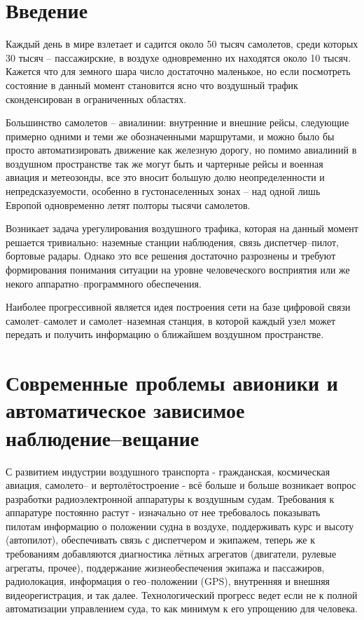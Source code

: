 \documentclass[a4paper,12pt]{report} %
\begin{document}
\tableofcontents

\setlength{\parskip}{1em}
\chapter*{Введение} %

Каждый день в мире взлетает и садится около 50 тысяч самолетов, среди
которых 30 тысяч -- пассажирские, в воздухе одновременно их находятся около 10
тысяч. Кажется что для земного шара число достаточно маленькое, но если
посмотреть состояние в данный момент становится ясно что воздушный трафик
сконденсирован в ограниченных областях.

Большинство самолетов -- авиалинии: внутренние и внешние рейсы, следующие
примерно одними и теми же обозначенными маршрутами, и можно было бы просто
автоматизировать движение как железную дорогу, но помимо авиалиний в воздушном
пространстве так же могут быть и чартерные рейсы и военная авиация и метеозонды,
все это вносит большую долю неопределенности и непредсказуемости, особенно в
густонаселенных зонах -- над одной лишь Европой одновременно летят полторы тысячи
самолетов.

Возникает задача урегулирования воздушного трафика, которая на данный момент
решается тривиально: наземные станции наблюдения, связь диспетчер--пилот,
бортовые радары. Однако это все решения достаточно разрознены и требуют
формирования понимания ситуации на уровне человеческого восприятия или же некого
аппаратно--программного обеспечения.

Наиболее прогрессивной является идея построения сети на базе цифровой связи
самолет--самолет и самолет--наземная станция, в которой каждый узел может
передать и получить информацию о ближайшем воздушном пространстве.
\newpage
\chapter{Современные проблемы авионики и автоматическое зависимое
  наблюдение--вещание} %

С развитием индустрии воздушного транспорта - гражданская, космическая авиация,
самолето-- и вертолётостроение - всё больше и больше возникает вопрос разработки
радиоэлектронной аппаратуры к воздушным судам. Требования к аппаратуре постоянно
растут - изначально от нее требовалось показывать пилотам информацию о положении
судна в воздухе, поддерживать курс и высоту (автопилот), обеспечивать связь с
диспетчером и экипажем, теперь же к требованиям добавляются диагностика лётных
агрегатов (двигатели, рулевые агрегаты, прочее), поддержание жизнеобеспечения
экипажа и пассажиров, радиолокация, информация о гео--положении
(GPS), внутренняя и внешняя видеорегистрация, и так далее. Технологический
прогресс ведет если не к полной автоматизации управлением суда, то как минимум к
его упрощению для человека.
\end{document}
